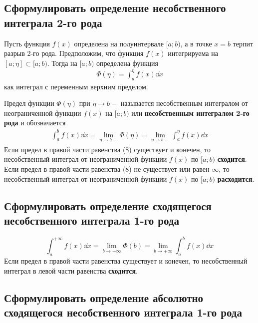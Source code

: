 \subsection{Сформулировать определение несобственного интеграла 2-го рода}
Пусть функция $f(x)$ определена на полуинтервале $[a;b)$, а в точке $x = b$ терпит разрыв 2-го рода. Предположим, что функция $f(x)$ интегрируема на $[a; \eta] \subset [a;b)$. Тогда на $[a; b)$ определена функция
\begin{gather}
    \Phi (\eta) = \int_{a}^{\eta} f(x)\dd{x}
\end{gather}
как интеграл с переменным верхним пределом. \\
\begin{definition}
    Предел функции $\Phi (\eta)$ при $\eta \to b-$ называется несобственным интегралом от неограниченной функции $f(x)$ на $[a;b)$ или \textbf{несобственным интегралом 2-го рода} и обозначается
    \begin{gather}
        \boxed{\int_{a}^{b} f(x)\dd{x} = \lim\limits_{\eta \to b-} \Phi (\eta) = \lim\limits_{\eta \to b-} \int_{a}^{\eta} f(x)\dd{x}}
    \end{gather}
    Если предел в правой части равенства (8) существует и конечен, то несобственный интеграл от неограниченной функции $f(x)$ по $[a;b)$ \textbf{сходится}.\\
    Если предел в правой части равенства (8) не существует или равен $\infty$, то несобственный интеграл от неограниченной функции $f(x)$ по $[a;b)$ \textbf{расходится}.
\end{definition}

\subsection{Сформулировать определение сходящегося несобственного интеграла 1-го рода}

\begin{definition}
    \[
        \int_{a}^{+\infty} f(x)\dd{x} = \lim_{b \to +\infty} \Phi(b) = \lim\limits_{b \to +\infty} \int_{a}^{b}f(x)\dd{x}
    \]
    Если предел в правой части равенства существует и конечен, то несобственный интеграл в левой части равенства \textbf{сходится}.
\end{definition}

\subsection{Сформулировать определение абсолютно сходящегося несобственного интеграла 1-го рода}

